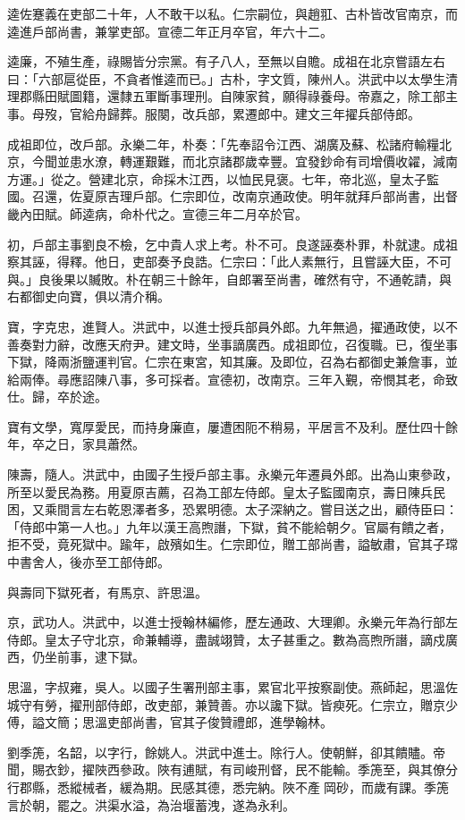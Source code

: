 \begin{pinyinscope}
逵佐蹇義在吏部二十年，人不敢干以私。仁宗嗣位，與趙羾、古朴皆改官南京，而逵進戶部尚書，兼掌吏部。宣德二年正月卒官，年六十二。

逵廉，不殖生產，祿賜皆分宗黨。有子八人，至無以自贍。成祖在北京嘗語左右曰：「六部扈從臣，不貪者惟逵而已。」古朴，字文質，陳州人。洪武中以太學生清理郡縣田賦圖籍，還隸五軍斷事理刑。自陳家貧，願得祿養母。帝嘉之，除工部主事。母歿，官給舟歸葬。服闋，改兵部，累遷郎中。建文三年擢兵部侍郎。

成祖即位，改戶部。永樂二年，朴奏：「先奉詔令江西、湖廣及蘇、松諸府輸糧北京，今聞並患水潦，轉運艱難，而北京諸郡歲幸豐。宜發鈔命有司增價收糴，減南方運。」從之。營建北京，命採木江西，以恤民見褒。七年，帝北巡，皇太子監國。召還，佐夏原吉理戶部。仁宗即位，改南京通政使。明年就拜戶部尚書，出督畿內田賦。師逵病，命朴代之。宣德三年二月卒於官。

初，戶部主事劉良不檢，乞中貴人求上考。朴不可。良遂誣奏朴罪，朴就逮。成祖察其誣，得釋。他日，吏部奏予良誥。仁宗曰：「此人素無行，且嘗誣大臣，不可與。」良後果以贓敗。朴在朝三十餘年，自郎署至尚書，確然有守，不通乾請，與右都御史向寶，俱以清介稱。

寶，字克忠，進賢人。洪武中，以進士授兵部員外郎。九年無過，擢通政使，以不善奏對力辭，改應天府尹。建文時，坐事謫廣西。成祖即位，召復職。已，復坐事下獄，降兩浙鹽運判官。仁宗在東宮，知其廉。及即位，召為右都御史兼詹事，並給兩俸。尋應詔陳八事，多可採者。宣德初，改南京。三年入覲，帝憫其老，命致仕。歸，卒於途。

寶有文學，寬厚愛民，而持身廉直，屢遭困阨不稍易，平居言不及利。歷仕四十餘年，卒之日，家具蕭然。

陳壽，隨人。洪武中，由國子生授戶部主事。永樂元年遷員外郎。出為山東參政，所至以愛民為務。用夏原吉薦，召為工部左侍郎。皇太子監國南京，壽日陳兵民困，又乘間言左右乾恩澤者多，恐累明德。太子深納之。嘗目送之出，顧侍臣曰：「侍郎中第一人也。」九年以漢王高煦譖，下獄，貧不能給朝夕。官屬有饋之者，拒不受，竟死獄中。踰年，啟殯如生。仁宗即位，贈工部尚書，謚敏肅，官其子瑺中書舍人，後亦至工部侍郎。

與壽同下獄死者，有馬京、許思溫。

京，武功人。洪武中，以進士授翰林編修，歷左通政、大理卿。永樂元年為行部左侍郎。皇太子守北京，命兼輔導，盡誠翊贊，太子甚重之。數為高煦所譖，謫戍廣西，仍坐前事，逮下獄。

思溫，字叔雍，吳人。以國子生署刑部主事，累官北平按察副使。燕師起，思溫佐城守有勞，擢刑部侍郎，改吏部，兼贊善。亦以讒下獄。皆瘐死。仁宗立，贈京少傅，謚文簡；思溫吏部尚書，官其子俊贊禮郎，進學翰林。

劉季箎，名韶，以字行，餘姚人。洪武中進士。除行人。使朝鮮，卻其饋贐。帝聞，賜衣鈔，擢陜西參政。陜有逋賦，有司峻刑督，民不能輸。季箎至，與其僚分行郡縣，悉縱械者，緩為期。民感其德，悉完納。陜不產岡砂，而歲有課。季箎言於朝，罷之。洪渠水溢，為治堰蓄洩，遂為永利。


\end{pinyinscope}
